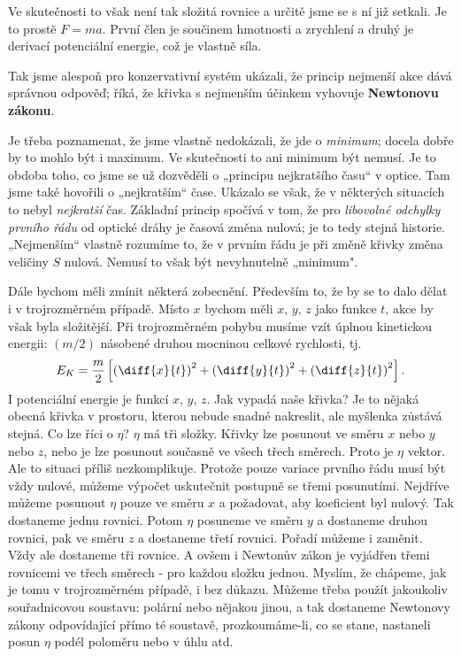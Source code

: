     Ve skutečnosti to však není tak složitá rovnice a určitě jsme se s ní již setkali. Je to prostě
    \(F=ma\). První člen je součinem hmotnosti a zrychlení a druhý je derivací potenciální energie,
    což je vlastně síla.

    Tak jsme alespoň pro konzervativní systém ukázali, že princip nejmenší akce dává správnou
    odpověď; říká, že křivka s nejmenším účinkem vyhovuje \textbf{Newtonovu zákonu}.

    Je třeba poznamenat, že jsme vlastně nedokázali, že jde o \emph{minimum}; docela dobře by to
    mohlo být i maximum. Ve skutečnosti to ani minimum být nemusí. Je to obdoba toho, co jsme se už
    dozvěděli o „principu nejkratšího času“ v optice. Tam jsme také hovořili o „nejkratším“ čase.
    Ukázalo se však, že v některých situacích to nebyl \emph{nejkratší} čas. Základní princip
    spočívá v tom, že pro \emph{libovolné odchylky prvního řádu} od optické dráhy je časová změna
    nulová; je to tedy stejná historie. „Nejmenším“ vlastně rozumíme to, že v prvním řádu je při
    změně křivky změna veličiny \(S\) nulová. Nemusí to však být nevyhnutelně „minimum".
    
    Dále bychom měli zmínit některá zobecnění. Především to, že by se to dalo dělat i v
    trojrozměrném případě. Místo \(x\) bychom měli \(x\), \(y\), \(z\) jako funkce \(t\), akce by
    však byla složitější. Při trojrozměrném pohybu musíme vzít úplnou kinetickou energii: \((m/2)\)
    násobené druhou mocninou celkové rychlosti, tj.
    \begin{equation*}
      E_K =  \dfrac{m}{2}\left[
              \left(\diff{x}{t}\right)^2 +
              \left(\diff{y}{t}\right)^2 + 
              \left(\diff{z}{t}\right)^2
            \right].
    \end{equation*}
    I potenciální energie je funkcí \(x\), \(y\), \(z\). Jak vypadá naše křivka? Je to nějaká obecná
    křivka v prostoru, kterou nebude snadné nakreslit, ale myšlenka zůstává stejná. Co lze říci o
    \(\eta\)? \(\eta\) má tři složky. Křivky lze posunout ve směru \(x\) nebo \(y\) nebo \(z\), nebo
    je lze posunout současně ve všech třech směrech. Proto je \(\eta\) vektor. Ale to situaci příliš
    nezkomplikuje. Protože pouze variace prvního řádu musí být vždy nulové, můžeme výpočet
    uskutečnit postupně se třemi posunutími. Nejdříve můžeme posunout \(\eta\) pouze ve směru \(x\)
    a požadovat, aby koeficient byl nulový. Tak dostaneme jednu rovnici. Potom \(\eta\) posuneme ve
    směru \(y\) a dostaneme druhou rovnici, pak ve směru \(z\) a dostaneme třetí rovnici. Pořadí
    můžeme i zaměnit. Vždy ale dostaneme tři rovnice. A ovšem i Newtonův zákon je vyjádřen třemi
    rovnicemi ve třech směrech - pro každou složku jednou. Myslím, že chápeme, jak je tomu v
    trojrozměrném případě, i bez důkazu. Můžeme třeba použít jakoukoliv souřadnicovou soustavu:
    polární nebo nějakou jinou, a tak dostaneme Newtonovy zákony odpovídající přímo té soustavě,
    prozkoumáme-li, co se stane, nastaneli posun \(\eta\) podél poloměru nebo v úhlu atd.

